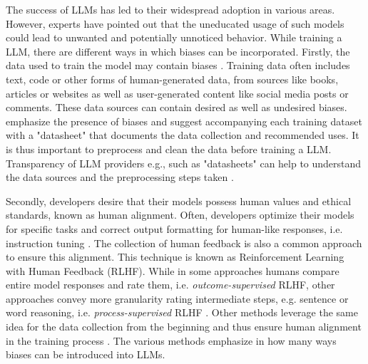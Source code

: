 \par The success of LLMs has led to their widespread adoption in various areas. However, experts have pointed out that the uneducated usage of such models could lead to unwanted and potentially unnoticed behavior. While training a LLM, there are different ways in which biases can be incorporated. Firstly, the data used to train the model may contain biases \parencite{bender2021dangers, naveed2023comprehensive, zhao2023survey}. Training data often includes text, code or other forms of human-generated data, from sources like books, articles or websites as well as user-generated content like social media posts or comments. These data sources can contain desired as well as undesired biases. \textcite{gebru2021datasheets} emphasize the presence of biases and suggest accompanying each training dataset with a "datasheet" that documents the data collection and recommended uses. It is thus important to preprocess and clean the data before training a LLM. Transparency of LLM providers e.g., such as "datasheets" can help to understand the data sources and the preprocessing steps taken \parencite{naveed2023comprehensive, zhao2023survey}.

\par Secondly, developers desire that their models possess human values and ethical standards, known as human alignment. Often, developers optimize their models for specific tasks and correct output formatting for human-like responses, i.e. instruction tuning \parencite{zhao2023survey}. The collection of human feedback is also a common approach to ensure this alignment. This technique is known as Reinforcement Learning with Human Feedback (RLHF). While in some approaches humans compare entire model responses and rate them, i.e. \textit{outcome-supervised} RLHF, other approaches convey more granularity rating intermediate steps, e.g. sentence or word reasoning, i.e. \textit{process-supervised} RLHF \parencite{zhao2023survey}. Other methods leverage the same idea for the data collection from the beginning and thus ensure human alignment in the training process \parencite{ouyang2022training}. The various methods emphasize in how many ways biases can be introduced into LLMs.

